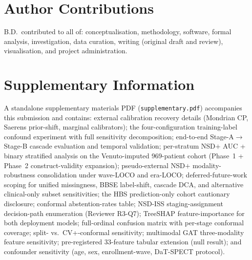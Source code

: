 \section*{Author Contributions}
B.D.\ contributed to all of: conceptualisation, methodology, software, formal analysis, investigation, data curation, writing (original draft and review), visualisation, and project administration.


\section*{Supplementary Information}
\label{p1:sec:supp}

A standalone supplementary materials PDF (\texttt{supplementary.pdf}) accompanies this submission and contains: external calibration recovery details (Mondrian CP, Saerens prior-shift, marginal calibrators); the four-configuration training-label confound experiment with full sensitivity decomposition; end-to-end Stage-A$\to$Stage-B cascade evaluation and temporal validation; per-stratum NSD$+$ AUC + binary stratified analysis on the Venuto-imputed 969-patient cohort (Phase~1 + Phase~2 construct-validity expansion); pseudo-external NSD$+$ modality-robustness consolidation under wave-LOCO and era-LOCO; deferred-future-work scoping for unified missingness, BBSE label-shift, cascade DCA, and alternative clinical-only subset sensitivities; the HBS prediction-only cohort cautionary disclosure; conformal abstention-rates table; NSD-ISS staging-assignment decision-path enumeration (Reviewer R3-Q7); TreeSHAP feature-importance for both deployment models; full-ordinal confusion matrix with per-stage conformal coverage; split- vs.\ CV+-conformal sensitivity; multimodal GAT three-modality feature sensitivity; pre-registered 33-feature tabular extension (null result); and confounder sensitivity (age, sex, enrollment-wave, DaT-SPECT protocol).
